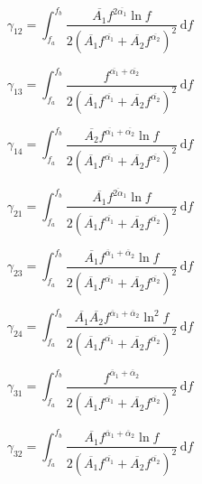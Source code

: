 \documentclass[a4paper,12pt]{article}
\begin{document}
\begin{equation}
    \gamma_{12} =  \int_{f_a}^{f_b} \frac{\overline{A_1}f^{2 \overline{ \alpha_1}} \ln f}{2(\overline{A_1}f^{\overline{ \alpha_1}} +\overline{A_2}f^{\overline{ \alpha_2}})^2} \, \mathrm{d}f 
\end{equation}

\begin{equation}
    \gamma_{13} =  \int_{f_a}^{f_b} \frac{f^{\overline{ \alpha_1}+\overline{ \alpha_2}} }{2(\overline{A_1}f^{\overline{ \alpha_1}} +\overline{A_2}f^{\overline{ \alpha_2}})^2} \, \mathrm{d}f 
\end{equation}

\begin{equation}
    \gamma_{14} =  \int_{f_a}^{f_b} \frac{ \overline{A_2} f^{\overline{ \alpha_1} + \overline{ \alpha_2}} \ln f }{2(\overline{A_1}f^{\overline{ \alpha_1}} +\overline{A_2}f^{\overline{ \alpha_2}})^2} \, \mathrm{d}f 
\end{equation}

\begin{equation}
    \gamma_{21} =  \int_{f_a}^{f_b} \frac{ \overline{A_1} f^{\overline{2 \alpha}_1}  \ln f}{2(\overline{A_1}f^{\overline{ \alpha_1}} +\overline{A_2}f^{\overline{ \alpha_2}})^2} \, \mathrm{d}f 
\end{equation}

\begin{equation}
    \gamma_{23} =  \int_{f_a}^{f_b} \frac{ \overline{A_1} f^{\overline{ \alpha}_1 + \overline{ \alpha}_2}  \ln f}{2(\overline{A_1}f^{\overline{ \alpha_1}} +\overline{A_2}f^{\overline{ \alpha_2}})^2} \, \mathrm{d}f 
\end{equation}

\begin{equation}
    \gamma_{24} =  \int_{f_a}^{f_b} \frac{ \overline{A_1} \overline{A_2} f^{\overline{ \alpha}_1 + \overline{ \alpha}_2}  \ln ^2 f}{2(\overline{A_1}f^{\overline{ \alpha_1}} +\overline{A_2}f^{\overline{ \alpha_2}})^2} \, \mathrm{d}f 
\end{equation}


\begin{equation}
    \gamma_{31} =  \int_{f_a}^{f_b} \frac{ f^{\overline{ \alpha}_1 + \overline{ \alpha}_2}}{2(\overline{A_1}f^{\overline{ \alpha_1}} +\overline{A_2}f^{\overline{ \alpha_2}})^2} \, \mathrm{d}f 
\end{equation}

\begin{equation}
    \gamma_{32} =  \int_{f_a}^{f_b} \frac{ \overline{A_1} f^{\overline{ \alpha}_1 + \overline{ \alpha}_2}  \ln f}{2(\overline{A_1}f^{\overline{ \alpha_1}} +\overline{A_2}f^{\overline{ \alpha_2}})^2} \, \mathrm{d}f 
\end{equation}
\end{document}
